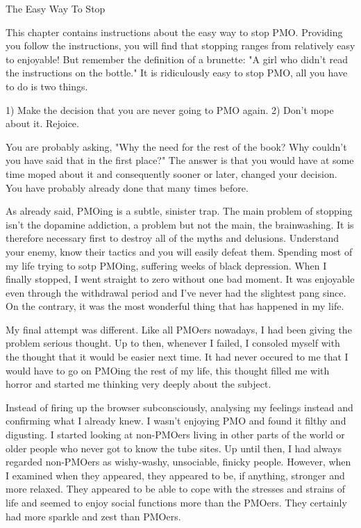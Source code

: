 The Easy Way To Stop

This chapter contains instructions about the easy way to stop PMO. Providing you follow the instructions, you will find that stopping ranges from relatively easy to enjoyable! But remember the definition of a brunette: "A girl who didn't read the instructions on the bottle." It is ridiculously easy to stop PMO, all you have to do is two things.

  1) Make the decision that you are never going to PMO again.
  2) Don't mope about it. Rejoice.

You are probably asking, "Why the need for the rest of the book? Why couldn't you have said that in the first place?" The answer is that you would have at some time moped about it and consequently sooner or later, changed your decision. You have probably already done that many times before.

As already said, PMOing is a subtle, sinister trap. The main problem of stopping isn't the dopamine addiction, a problem but not the main, the brainwashing. It is therefore necessary first to destroy all of the myths and delusions. Understand your enemy, know their tactics and you will easily defeat them. Spending most of my life trying to sotp PMOing, suffering weeks of black depression. When I finally stopped, I went straight to zero without one bad moment. It was enjoyable even through the withdrawal period and I've never had the slightest pang since. On the contrary, it was the most wonderful thing that has happened in my life.

My final attempt was different. Like all PMOers nowadays, I had been giving the problem serious thought. Up to then, whenever I failed, I consoled myself with the thought that it would be easier next time. It had never occured to me that I would have to go on PMOing the rest of my life, this thought filled me with horror and started me thinking very deeply about the subject.

Instead of firing up the browser subconsciously, analysing my feelings instead and confirming what I already knew. I wasn't enjoying PMO and found it filthy and digusting. I started looking at non-PMOers living in other parts of the world or older people who never got to know the tube sites. Up until then, I had always regarded non-PMOers as wishy-washy, unsociable, finicky people. However, when I examined when they appeared, they appeared to be, if anything, stronger and more relaxed. They appeared to be able to cope with the stresses and strains of life and seemed to enjoy social functions more than the PMOers. They certainly had more sparkle and zest than PMOers.

